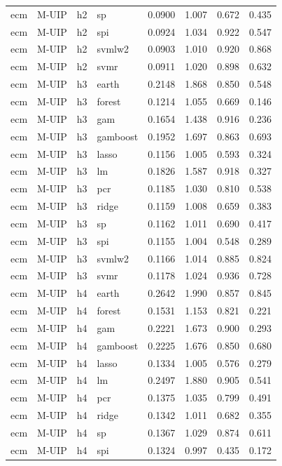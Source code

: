 \begin{ThreePartTable}
\begin{longtable}[t]{llclcccc}
ecm & M-UIP & h2 & sp & 0.0900 & 1.007 & 0.672 & 0.435\\
ecm & M-UIP & h2 & spi & 0.0924 & 1.034 & 0.922 & 0.547\\
ecm & M-UIP & h2 & svmlw2 & 0.0903 & 1.010 & 0.920 & 0.868\\
ecm & M-UIP & h2 & svmr & 0.0911 & 1.020 & 0.898 & 0.632\\
\addlinespace
ecm & M-UIP & h3 & earth & 0.2148 & 1.868 & 0.850 & 0.548\\
ecm & M-UIP & h3 & forest & 0.1214 & 1.055 & 0.669 & 0.146\\
ecm & M-UIP & h3 & gam & 0.1654 & 1.438 & 0.916 & 0.236\\
ecm & M-UIP & h3 & gamboost & 0.1952 & 1.697 & 0.863 & 0.693\\
ecm & M-UIP & h3 & lasso & 0.1156 & 1.005 & 0.593 & 0.324\\
ecm & M-UIP & h3 & lm & 0.1826 & 1.587 & 0.918 & 0.327\\
ecm & M-UIP & h3 & pcr & 0.1185 & 1.030 & 0.810 & 0.538\\
ecm & M-UIP & h3 & ridge & 0.1159 & 1.008 & 0.659 & 0.383\\
ecm & M-UIP & h3 & sp & 0.1162 & 1.011 & 0.690 & 0.417\\
ecm & M-UIP & h3 & spi & 0.1155 & 1.004 & 0.548 & 0.289\\
ecm & M-UIP & h3 & svmlw2 & 0.1166 & 1.014 & 0.885 & 0.824\\
ecm & M-UIP & h3 & svmr & 0.1178 & 1.024 & 0.936 & 0.728\\
\addlinespace
ecm & M-UIP & h4 & earth & 0.2642 & 1.990 & 0.857 & 0.845\\
ecm & M-UIP & h4 & forest & 0.1531 & 1.153 & 0.821 & 0.221\\
ecm & M-UIP & h4 & gam & 0.2221 & 1.673 & 0.900 & 0.293\\
ecm & M-UIP & h4 & gamboost & 0.2225 & 1.676 & 0.850 & 0.680\\
ecm & M-UIP & h4 & lasso & 0.1334 & 1.005 & 0.576 & 0.279\\
ecm & M-UIP & h4 & lm & 0.2497 & 1.880 & 0.905 & 0.541\\
ecm & M-UIP & h4 & pcr & 0.1375 & 1.035 & 0.799 & 0.491\\
ecm & M-UIP & h4 & ridge & 0.1342 & 1.011 & 0.682 & 0.355\\
ecm & M-UIP & h4 & sp & 0.1367 & 1.029 & 0.874 & 0.611\\
ecm & M-UIP & h4 & spi & 0.1324 & 0.997 & 0.435 & 0.172\\

\end{longtable}
\end{ThreePartTable}
